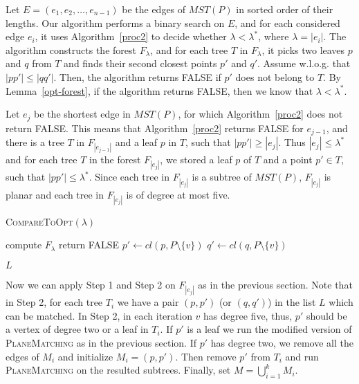 \documentclass[11pt,a4paper]{article}
\newcommand{\btopt}{\lambda^*}
\begin{document}
Let $E=(e_1, e_2, \dots ,e_{n-1})$ be the edges of $MST(P)$ in sorted order of their lengths. Our algorithm performs a binary search on $E$, and for each considered edge $e_i$, it uses Algorithm~\ref{proc2} to decide whether $\lambda < \btopt$, where $\lambda=|e_i|$. 
The algorithm constructs the forest $F_{\lambda}$, and for each tree $T$ in $F_{\lambda}$, it picks two leaves $p$ and $q$ from $T$ and finds their second closest points $p'$ and $q'$. Assume w.l.o.g. that $|pp'| \le |qq'|$. Then, the algorithm returns FALSE if $p'$ does not belong to $T$. By Lemma~\ref{opt-forest}, if the algorithm returns FALSE, then we know that $\lambda <\btopt$. 

Let $e_j$ be the shortest edge in $MST(P)$, for which Algorithm~\ref{proc2} does not return FALSE. This means that Algorithm~\ref{proc2} returns FALSE for $e_{j-1}$, and there is a tree $T$ in $F_{|e_{j-1}|}$ and a leaf $p$ in $T$, such that $|pp'|\ge |e_j|$. Thus $|e_j|\leq\btopt$ and for each tree $T$ in the forest $F_{|e_j|}$, we stored a leaf $p$ of $T$ and a point $p' \in T$, such that $|pp'| \le \btopt$. Since each tree in $F_{|e_j|}$ is a subtree of $MST(P)$, $F_{|e_j|}$ is planar and each tree in $F_{|e_j|}$ is of degree at most five. 


\begin{algorithm}                      \caption{{\scshape CompareToOpt}$(\lambda)$}          \label{proc2} 
\begin{algorithmic}[1]

  \State compute $F_{\lambda}$ 
		\State return {FALSE} \EndIf
  \State $p' \gets cl(p, P\setminus \{v\} )$
	\State $q' \gets cl(q, P\setminus \{v\} )$
	
				\State {}
			\Else
				  \EndIf
  \Else 
				\State {}
			\Else
				  \EndIf
  \EndIf \EndIf
	\EndFor
\State \Return $L$
	
\end{algorithmic}
\end{algorithm}



Now we can apply Step 1 and Step 2 on $F_{|e_j|}$ as in the previous section. Note that in Step 2, for each tree $T_i$ we have a pair $(p,p')$ (or $(q,q')$) in the list $L$ which can be matched. In Step 2, in each iteration $v$ has degree five, thus, $p'$ should be a vertex
of degree two or a leaf in $T_i$. If $p'$ is a leaf we run the modified version of {\scshape PlaneMatching} as in the previous section. If $p'$ has degree two, we remove all the edges of $M_i$ and initialize $M_i = {(p, p')}$. Then remove $p'$ from $T_i$ and run {\scshape PlaneMatching} on the resulted subtrees. Finally, set $M=\bigcup_{i=1}^{k}M_i$.
\end{document}

